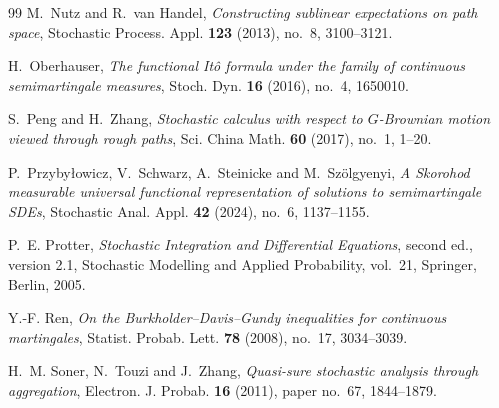 \documentclass[11pt,reqno]{amsart}
\theoremstyle{plain}
\theoremstyle{definition}
\begin{document}
\begin{thebibliography}{99}
M.~Nutz and R.~van Handel,
\emph{Constructing sublinear expectations on path space},
Stochastic Process. Appl. \textbf{123} (2013), no.~8, 3100--3121.

H.~Oberhauser,
\emph{The functional It{\^o} formula under the family of continuous
semimartingale measures},
Stoch. Dyn. \textbf{16} (2016), no.~4, 1650010.

S.~Peng and H.~Zhang,
\emph{Stochastic calculus with respect to \(G\)-Brownian motion viewed
through rough paths},
Sci. China Math. \textbf{60} (2017), no.~1, 1--20.

P.~Przyby{\l}owicz, V.~Schwarz, A.~Steinicke and M.~Sz{\"o}lgyenyi,
\emph{A Skorohod measurable universal functional representation of
solutions to semimartingale SDEs},
Stochastic Anal. Appl. \textbf{42} (2024), no.~6, 1137--1155.

P.~E. Protter,
\emph{Stochastic Integration and Differential Equations},
second ed., version 2.1, Stochastic Modelling and Applied Probability,
vol.~21, Springer, Berlin, 2005.

Y.-F. Ren,
\emph{On the Burkholder--Davis--Gundy inequalities for continuous
martingales},
Statist. Probab. Lett. \textbf{78} (2008), no.~17, 3034--3039.

H.~M. Soner, N.~Touzi and J.~Zhang,
\emph{Quasi-sure stochastic analysis through aggregation},
Electron. J. Probab. \textbf{16} (2011), paper no.~67, 1844--1879.

\end{thebibliography}
\end{document}
